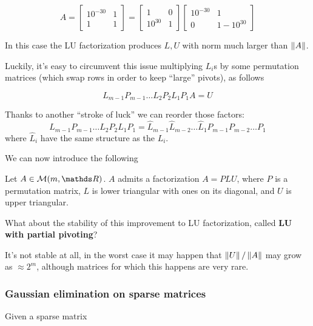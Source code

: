 \documentclass[ComputationalMathematics.tex]{subfiles}
\begin{document}
\begin{example}
\[
A = \begin{bmatrix}
    10^{-30} & 1\\
    1 & 1
\end{bmatrix} = \begin{bmatrix}
    1 & 0\\
    10^{30} & 1 
\end{bmatrix}
\begin{bmatrix}
    10^{-30} & 1\\
    0 & 1-10^{30}
\end{bmatrix}
\]

In this case the LU factorization produces $L,U$ with norm much larger than $\left\lVert A\right\rVert$.
\end{example}

Luckily, it's easy to circumvent this issue multiplying $L_i$s by some permutation matrices (which swap rows in order to keep ``large'' pivots), as follows

\[
L_{m-1}P_{m-1}\dots L_2P_2L_1P_1A = U
\]

\begin{obs}
Thanks to another ``stroke of luck'' we can reorder those factors: 
\[
L_{m-1}P_{m-1}\dots L_2P_2L_1P_1 = \widehat{L}_{m-1}\widehat{L}_{m-2}\dots \widehat{L}_1 P_{m-1}P_{m-2}\dots P_1
\]
where $\widehat{L}_i$ have the same structure as the $L_i$.
\end{obs}

We can now introduce the following

\begin{theorem}
  Let $A \in \mathcal{M}(m, \R)$. $A$ admits a factorization $A=PLU$, where $P$ is a permutation matrix, $L$ is lower triangular with ones on its diagonal, and $U$ is upper triangular.
\end{theorem}

What about the stability of this improvement to LU factorization, called \textbf{LU with partial pivoting}?

It's not stable at all, in the worst case it may happen that $\left\lVert U\right\rVert / \left\lVert A\right\rVert$ may grow as $\approx 2^m$, although matrices for which this happens are very rare.

\subsubsection{Gaussian elimination on sparse matrices}

Given a sparse matrix 
\end{document}
